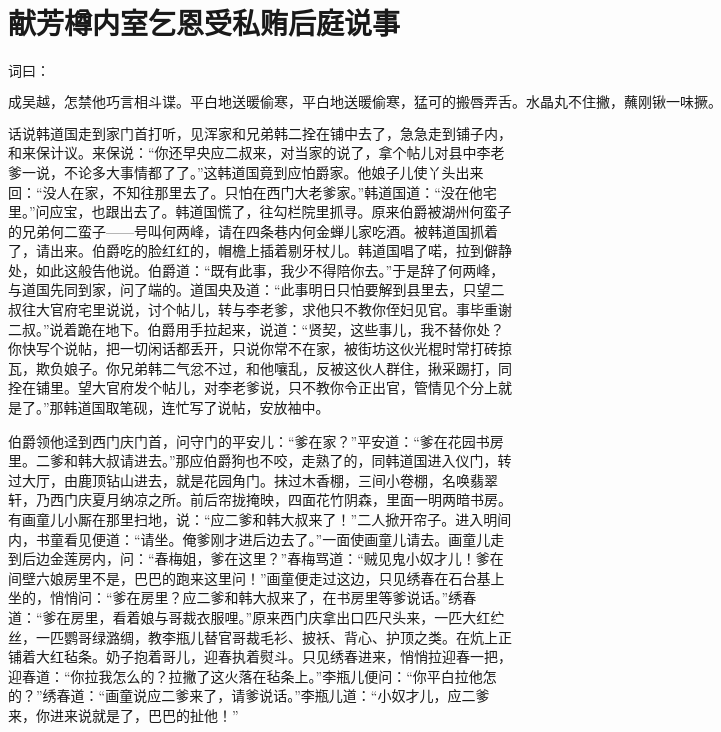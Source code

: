 

\chapter{献芳樽内室乞恩\KG 受私贿后庭说事}


词曰：

\[
成吴越，怎禁他巧言相斗谍。平白地送暖偷寒，平白地送暖偷寒，猛可的搬唇弄舌。水晶丸不住撇，蘸刚锹一味撅。
\]

话说韩道国走到家门首打听，见浑家和兄弟韩二拴在铺中去了，急急走到铺子内，和来保计议。来保说：“你还早央应二叔来，对当家的说了，拿个帖儿对县中李老爹一说，不论多大事情都了了。”这韩道国竟到应怕爵家。他娘子儿使丫头出来回：“没人在家，不知往那里去了。只怕在西门大老爹家。”韩道国道：“没在他宅里。”问应宝，也跟出去了。韩道国慌了，往勾栏院里抓寻。原来伯爵被湖州何蛮子的兄弟何二蛮子——号叫何两峰，请在四条巷内何金蝉儿家吃酒。被韩道国抓着了，请出来。伯爵吃的脸红红的，帽檐上插着剔牙杖儿。韩道国唱了喏，拉到僻静处，如此这般告他说。伯爵道：“既有此事，我少不得陪你去。”于是辞了何两峰，与道国先同到家，问了端的。道国央及道：“此事明日只怕要解到县里去，只望二叔往大官府宅里说说，讨个帖儿，转与李老爹，求他只不教你侄妇见官。事毕重谢二叔。”说着跪在地下。伯爵用手拉起来，说道：“贤契，这些事儿，我不替你处？你快写个说帖，把一切闲话都丢开，只说你常不在家，被街坊这伙光棍时常打砖掠瓦，欺负娘子。你兄弟韩二气忿不过，和他嚷乱，反被这伙人群住，揪采踢打，同拴在铺里。望大官府发个帖儿，对李老爹说，只不教你令正出官，管情见个分上就是了。”那韩道国取笔砚，连忙写了说帖，安放袖中。

伯爵领他迳到西门庆门首，问守门的平安儿：“爹在家？”平安道：“爹在花园书房里。二爹和韩大叔请进去。”那应伯爵狗也不咬，走熟了的，同韩道国进入仪门，转过大厅，由鹿顶钻山进去，就是花园角门。抹过木香棚，三间小卷棚，名唤翡翠轩，乃西门庆夏月纳凉之所。前后帘拢掩映，四面花竹阴森，里面一明两暗书房。有画童儿小厮在那里扫地，说：“应二爹和韩大叔来了！”二人掀开帘子。进入明间内，书童看见便道：“请坐。俺爹刚才进后边去了。”一面使画童儿请去。画童儿走到后边金莲房内，问：“春梅姐，爹在这里？”春梅骂道：“贼见鬼小奴才儿！爹在间壁六娘房里不是，巴巴的跑来这里问！”画童便走过这边，只见绣春在石台基上坐的，悄悄问：“爹在房里？应二爹和韩大叔来了，在书房里等爹说话。”绣春道：“爹在房里，看着娘与哥裁衣服哩。”原来西门庆拿出口匹尺头来，一匹大红纻丝，一匹鹦哥绿潞绸，教李瓶儿替官哥裁毛衫、披袄、背心、护顶之类。在炕上正铺着大红毡条。奶子抱着哥儿，迎春执着熨斗。只见绣春进来，悄悄拉迎春一把，迎春道：“你拉我怎么的？拉撇了这火落在毡条上。”李瓶儿便问：“你平白拉他怎的？”绣春道：“画童说应二爹来了，请爹说话。”李瓶儿道：“小奴才儿，应二爹来，你进来说就是了，巴巴的扯他！”

